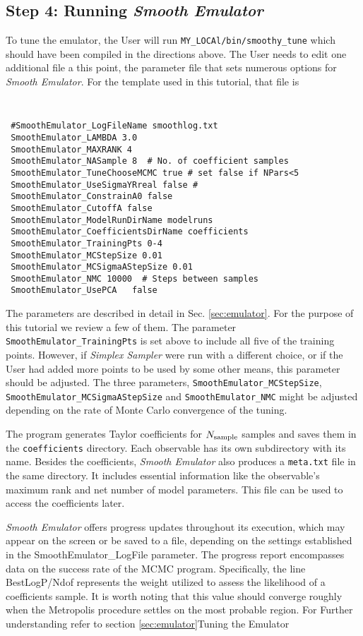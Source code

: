 \documentclass[UserManual.tex]{subfiles}
\begin{document}
\subsection{Step 4: Running {\it Smooth Emulator}}
To tune the emulator, the User will run {\tt MY\_LOCAl/bin/smoothy\_tune} which should have been compiled in the directions above. The User needs to edit one additional file a this point, the parameter file that sets numerous options for {\it Smooth Emulator}. For the template used in this tutorial, that file is
\vspace{-20pt}
{\tt
\begin{verbatim}
 #SmoothEmulator_LogFileName smoothlog.txt
 SmoothEmulator_LAMBDA 3.0
 SmoothEmulator_MAXRANK 4
 SmoothEmulator_NASample 8  # No. of coefficient samples
 SmoothEmulator_TuneChooseMCMC true # set false if NPars<5
 SmoothEmulator_UseSigmaYRreal false # 
 SmoothEmulator_ConstrainA0 false
 SmoothEmulator_CutoffA false
 SmoothEmulator_ModelRunDirName modelruns
 SmoothEmulator_CoefficientsDirName coefficients
 SmoothEmulator_TrainingPts 0-4
 SmoothEmulator_MCStepSize 0.01
 SmoothEmulator_MCSigmaAStepSize 0.01
 SmoothEmulator_NMC 10000  # Steps between samples 
 SmoothEmulator_UsePCA   false
\end{verbatim}
}
The parameters are described in detail in Sec. \ref{sec:emulator}. For the purpose of this tutorial we review a few of them. The parameter {\tt SmoothEmulator\_TrainingPts} is set above to include all five of the training points. However, if {\it Simplex Sampler} were run with a different choice, or if the User had added more points to be used by some other means, this parameter should be adjusted. The three parameters, {\tt SmoothEmulator\_MCStepSize}, {\tt SmoothEmulator\_MCSigmaAStepSize} and {\tt SmoothEmulator\_NMC} might be adjusted depending on the rate of Monte Carlo convergence of the tuning. 



 


The program generates Taylor coefficients for $N_{\rm sample}$ samples and saves them in the {\tt coefficients} directory. Each observable has its own subdirectory with its name. Besides the coefficients, {\it Smooth Emulator} also produces a {\tt meta.txt} file in the same directory. It includes essential information like the observable's maximum rank and net number of model parameters. This file can be used to access the coefficients later.

{\it Smooth Emulator} offers progress updates throughout its execution, which may appear on the screen or be saved to a file, depending on the settings established in the SmoothEmulator\_LogFile parameter. The progress report encompasses data on the success rate of the MCMC program. Specifically, the line BestLogP/Ndof represents the weight utilized to assess the likelihood of a coefficients sample. It is worth noting that this value should converge roughly when the Metropolis procedure settles on the most probable region. For Further understanding refer to section \ref{sec:emulator}{Tuning the Emulator}
\end{document}
